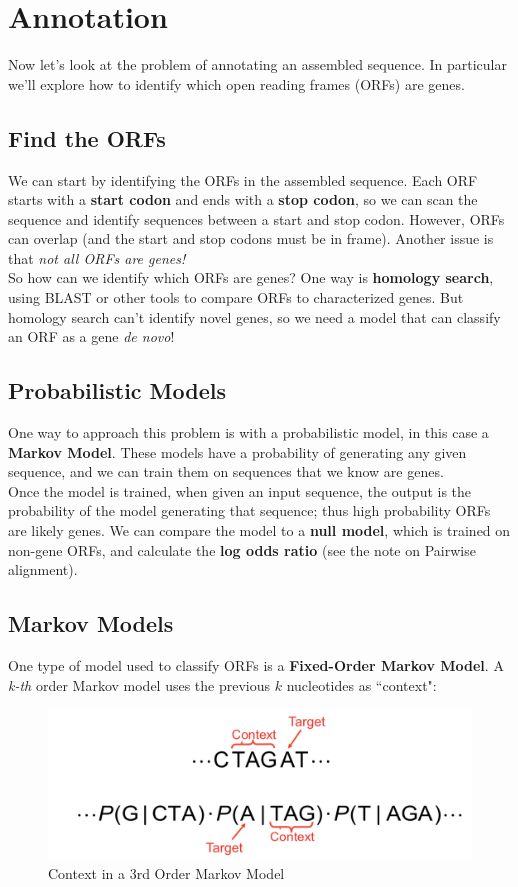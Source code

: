 \documentclass[12pt]{article}
\begin{document}
\section{Annotation}
Now let's look at the problem of annotating an assembled sequence. In particular we'll explore how to identify which open reading frames (ORFs) are genes.
\subsection{Find the ORFs}
We can start by identifying the ORFs in the assembled sequence. Each ORF starts with a \textbf{start codon} and ends with a \textbf{stop codon}, so we can scan the sequence and identify sequences between a start and stop codon. However, ORFs can overlap (and the start and stop codons must be in frame). Another issue is that \textit{not all ORFs are genes!} \\[10pt]
So how can we identify which ORFs are genes? One way is \textbf{homology search}, using BLAST or other tools to compare ORFs to characterized genes. But homology search can't identify novel genes, so we need a model that can classify an ORF as a gene \textit{de novo}!

\subsection{Probabilistic Models}
One way to approach this problem is with a probabilistic model, in this case a \textbf{Markov Model}. These models have a probability of generating any given sequence, and we can train them on sequences that we know are genes.\\[10pt]
Once the model is trained, when given an input sequence, the output is the probability of the model generating that sequence; thus high probability ORFs are likely genes. We can compare the model to a \textbf{null model}, which is trained on non-gene ORFs, and calculate the \textbf{log odds ratio} (see the note on Pairwise alignment).

\subsection{Markov Models}
One type of model used to classify ORFs is a \textbf{Fixed-Order Markov Model}. A \textit{k-th} order Markov model uses the previous $k$ nucleotides as ``context":
\begin{figure}[h!]
    \centering
    \includegraphics[width=.6\linewidth]{order_hmm.png}
    \caption{Context in a 3rd Order Markov Model}
    \label{fig:order}
\end{figure}
\end{document}
